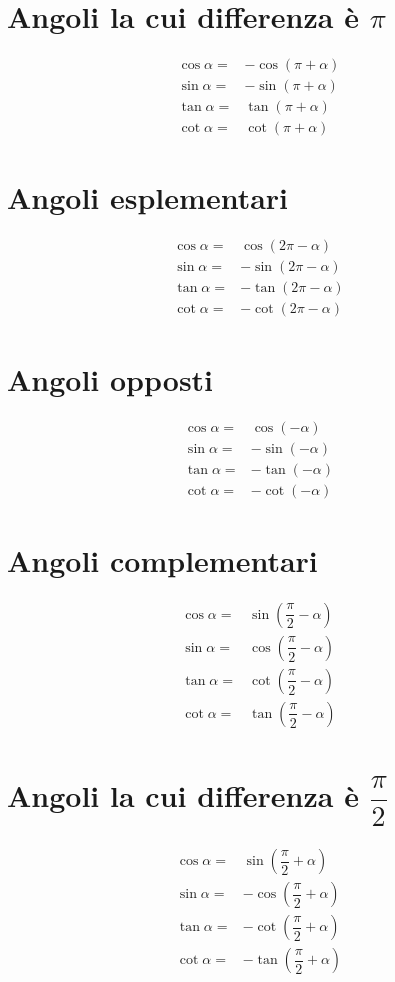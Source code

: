 \section{Angoli la cui differenza è \texorpdfstring{$\pi$}{\textpi}}
\begin{align*}
\cos\alpha=&-\cos(\pi+\alpha)\\
\sin\alpha=&-\sin(\pi+\alpha)\\
\tan\alpha=&\tan(\pi+\alpha)\\
\cot\alpha=&\cot(\pi+\alpha)
\end{align*}
\section{Angoli esplementari}\label{sec:angoli-esplementari}
\begin{align*}
\cos\alpha=&\cos(2\pi-\alpha)\\
\sin\alpha=&-\sin(2\pi-\alpha)\\
\tan\alpha=&-\tan(2\pi-\alpha)\\
\cot\alpha=&-\cot(2\pi-\alpha)
\end{align*}
\section{Angoli opposti}\label{sec:angoli-opposti}
\begin{align*}
\cos\alpha=&\cos(-\alpha)\\
\sin\alpha=&-\sin(-\alpha)\\
\tan\alpha=&-\tan(-\alpha)\\
\cot\alpha=&-\cot(-\alpha)
\end{align*}
\section{Angoli complementari}\label{sec:angoli-complementari}
\begin{align*}
\cos\alpha=&\sin(\dfrac{\pi}{2}-\alpha)\\
\sin\alpha=&\cos(\dfrac{\pi}{2}-\alpha)\\
\tan\alpha=&\cot(\dfrac{\pi}{2}-\alpha)\\
\cot\alpha=&\tan(\dfrac{\pi}{2}-\alpha)\\
\end{align*}
\section{Angoli la cui differenza è \texorpdfstring{$\dfrac{\pi}{2}$}{\textpi/2} }
\begin{align*}
\cos\alpha=&\sin(\dfrac{\pi}{2}+\alpha)\\
\sin\alpha=&-\cos(\dfrac{\pi}{2}+\alpha)\\
\tan\alpha=&-\cot(\dfrac{\pi}{2}+\alpha)\\
\cot\alpha=&-\tan(\dfrac{\pi}{2}+\alpha)\\
\end{align*}
